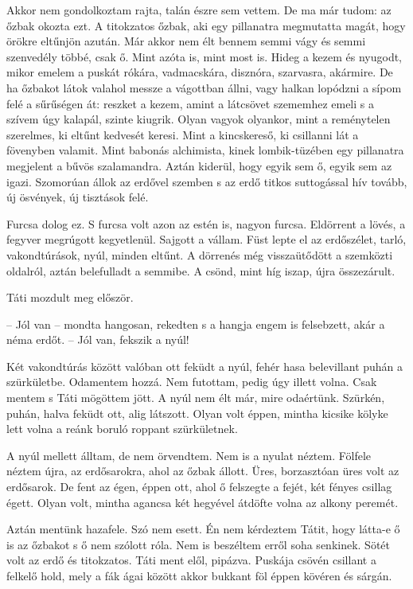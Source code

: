 \documentclass{IEEEtran}
\begin{document}
Akkor nem gondolkoztam rajta, talán észre sem vettem. De ma már tudom: az őzbak okozta ezt. A titokzatos őzbak, aki egy pillanatra megmutatta magát, hogy örökre eltűnjön azután. Már akkor nem élt bennem semmi vágy és semmi szenvedély többé, csak ő. Mint azóta is, mint most is. Hideg a kezem és nyugodt, mikor emelem a puskát rókára, vadmacskára, disznóra, szarvasra, akármire. De ha őzbakot látok valahol messze a vágottban állni, vagy halkan lopódzni a sípom felé a sűrűségen át: reszket a kezem, amint a látcsövet szememhez emeli s a szívem úgy kalapál, szinte kiugrik. Olyan vagyok olyankor, mint a reménytelen szerelmes, ki eltűnt kedvesét keresi. Mint a kincskereső, ki csillanni lát a fövenyben valamit. Mint babonás alchimista, kinek lombik-tüzében egy pillanatra megjelent a bűvös szalamandra. Aztán kiderül, hogy egyik sem ő, egyik sem az igazi. Szomorúan állok az erdővel szemben s az erdő titkos suttogással hív tovább, új ösvények, új tisztások felé.

Furcsa dolog ez. S furcsa volt azon az estén is, nagyon furcsa. Eldörrent a lövés, a fegyver megrúgott kegyetlenül. Sajgott a vállam. Füst lepte el az erdőszélet, tarló, vakondtúrások, nyúl, minden eltűnt. A dörrenés még visszaütődött a szemközti oldalról, aztán belefulladt a semmibe. A csönd, mint híg iszap, újra összezárult.

Táti mozdult meg először.

– Jól van – mondta hangosan, rekedten s a hangja engem is felsebzett, akár a néma erdőt. – Jól van, fekszik a nyúl!

Két vakondtúrás között valóban ott feküdt a nyúl, fehér hasa belevillant puhán a szürkületbe. Odamentem hozzá. Nem futottam, pedig úgy illett volna. Csak mentem s Táti mögöttem jött. A nyúl nem élt már, mire odaértünk. Szürkén, puhán, halva feküdt ott, alig látszott. Olyan volt éppen, mintha kicsike kölyke lett volna a reánk boruló roppant szürkületnek.

A nyúl mellett álltam, de nem örvendtem. Nem is a nyulat néztem. Fölfele néztem újra, az erdősarokra, ahol az őzbak állott. Üres, borzasztóan üres volt az erdősarok. De fent az égen, éppen ott, ahol ő felszegte a fejét, két fényes csillag égett. Olyan volt, mintha agancsa két hegyével átdöfte volna az alkony peremét.

Aztán mentünk hazafele. Szó nem esett. Én nem kérdeztem Tátit, hogy látta-e ő is az őzbakot s ő nem szólott róla. Nem is beszéltem erről soha senkinek. Sötét volt az erdő és titokzatos. Táti ment elől, pipázva. Puskája csövén csillant a felkelő hold, mely a fák ágai között akkor bukkant föl éppen kövéren és sárgán.
\end{document}
